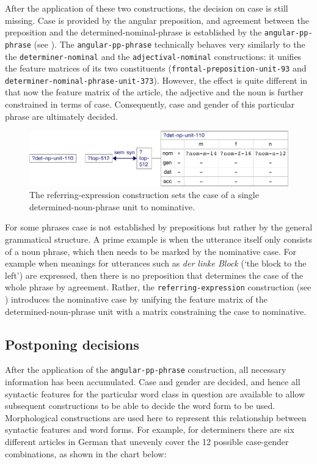 After the application of these two constructions, the decision on case
is still missing. Case is provided by the angular preposition, and
agreement between the preposition and the determined-nominal-phrase is
established by the {\footnotesize\tt angular-pp-phrase} (see ). The {\footnotesize\tt angular-pp-phrase}
technically behaves very similarly to the the {\footnotesize\tt determiner-nominal} and the {\footnotesize\tt adjectival-nominal}
constructions: it unifies the feature matrices of its two constituents
({\footnotesize\texttt{frontal-preposition-unit-93}} and
{\footnotesize\texttt{determiner-nominal-phrase-unit-373}}). However, the effect is
quite different in that now the feature matrix of the article, the
adjective and the noun is further constrained in terms of
case. Consequently, case and gender of this particular phrase are
ultimately decided.

\begin{figure}[t]
  \centerline{\includegraphics[scale=0.65]{figs/referring-expression-fvm}}
  \caption[Handling case in single determined-noun-phrases]{%
  The referring-expression construction sets the case of a
    single determined-noun-phrase unit to nominative.}
  \label{f:referring-expression-fvm}
\end{figure}

For some phrases case is not established by prepositions but
rather by the general grammatical structure. A prime example is when 
the utterance itself only consists of a noun phrase, which then needs to be marked by 
the nominative case. For example when meanings for utterances such as \textit{der
linke Block} (`the block to the left') are expressed, then there
is no preposition that determines the case of the whole
phrase by agreement. Rather, the {\footnotesize\texttt{referring-expression}}
construction (see )
introduces the nominative case by unifying the feature matrix of the
determined-noun-phrase unit with a matrix constraining the case to
nominative.

\subsection{Postponing decisions}
After the application of the {\footnotesize\tt angular-pp-phrase}
construction, all necessary information has been accumulated. Case and
gender are decided, and hence all syntactic features for the
particular word class in question are available to allow subsequent
constructions to be able to decide the word form to be used. Morphological
constructions are used here to represent this relationship between syntactic
features and word forms. For example, for determiners there
are six different articles in German that unevenly cover the 12
possible case-gender combinations, as shown in the chart below:


